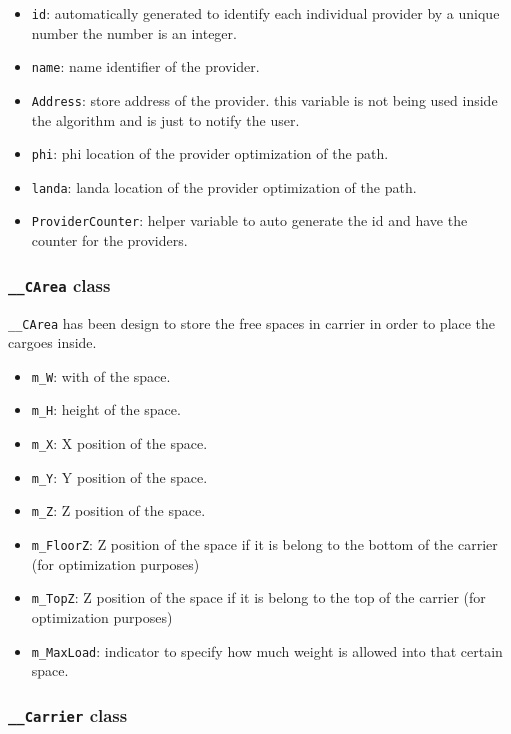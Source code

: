 \documentclass[oneside,titlepage,12pt]{memoir}
\begin{document}
\begin{itemize}
\itemsep1pt\parskip0pt
\item
  \texttt{id}: automatically generated to identify each individual
  provider by a unique number the number is an integer.
\item
  \texttt{name}: name identifier of the provider.
\item
  \texttt{Address}: store address of the provider. this variable is not
  being used inside the algorithm and is just to notify the user.
\item
  \texttt{phi}: phi location of the provider optimization of the path.
\item
  \texttt{landa}: landa location of the provider optimization of the
  path.
\item
  \texttt{ProviderCounter}: helper variable to auto generate the id and
  have the counter for the providers.
\end{itemize}

\subsubsection{\texttt{\_\_CArea} class}\label{carea-class}

\texttt{\_\_CArea} has been design to store the free spaces in carrier
in order to place the cargoes inside.

\begin{itemize}
\itemsep1pt\parskip0pt
\item
  \texttt{m\_W}: with of the space.
\item
  \texttt{m\_H}: height of the space.
\item
  \texttt{m\_X}: X position of the space.
\item
  \texttt{m\_Y}: Y position of the space.
\item
  \texttt{m\_Z}: Z position of the space.
\item
  \texttt{m\_FloorZ}: Z position of the space if it is belong to the
  bottom of the carrier (for optimization purposes)
\item
  \texttt{m\_TopZ}: Z position of the space if it is belong to the top
  of the carrier (for optimization purposes)
\item
  \texttt{m\_MaxLoad}: indicator to specify how much weight is allowed
  into that certain space.
\end{itemize}

\subsubsection{\texttt{\_\_Carrier} class}\label{carrier-class}
\end{document}
